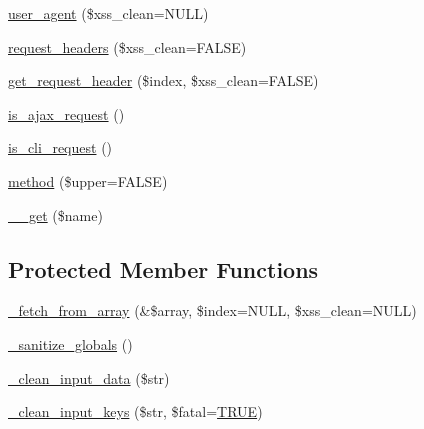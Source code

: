 \begin{DoxyCompactItemize}
\item 
\mbox{\hyperlink{class_c_i___input_a4374172b6440fd600f78ff8efc0906c9}{user\+\_\+agent}} (\$xss\+\_\+clean=N\+U\+LL)
\item 
\mbox{\hyperlink{class_c_i___input_a4bc8f8c9a9488ff359a61f1fb60e6097}{request\+\_\+headers}} (\$xss\+\_\+clean=F\+A\+L\+SE)
\item 
\mbox{\hyperlink{class_c_i___input_a099af71b54f9edbfb20576a4e8a3df41}{get\+\_\+request\+\_\+header}} (\$index, \$xss\+\_\+clean=F\+A\+L\+SE)
\item 
\mbox{\hyperlink{class_c_i___input_a4ae07120b0b2ace90eb2f7ec72b29426}{is\+\_\+ajax\+\_\+request}} ()
\item 
\mbox{\hyperlink{class_c_i___input_a70c1e8a081ef955c1a52164634d4f66e}{is\+\_\+cli\+\_\+request}} ()
\item 
\mbox{\hyperlink{class_c_i___input_aaa22626885bdf9dda2346ee6422203ef}{method}} (\$upper=F\+A\+L\+SE)
\item 
\mbox{\hyperlink{class_c_i___input_abc8e9e31bb15c8a44c3210ec551407c8}{\+\_\+\+\_\+get}} (\$name)
\end{DoxyCompactItemize}
\subsection*{Protected Member Functions}
\begin{DoxyCompactItemize}
\item 
\mbox{\hyperlink{class_c_i___input_aac46f9fee9467fac5711f236d248fbc7}{\+\_\+fetch\+\_\+from\+\_\+array}} (\&\$array, \$index=N\+U\+LL, \$xss\+\_\+clean=N\+U\+LL)
\item 
\mbox{\hyperlink{class_c_i___input_aadbb0e5cbf9b5783c872cb402ea6a2fa}{\+\_\+sanitize\+\_\+globals}} ()
\item 
\mbox{\hyperlink{class_c_i___input_a9c594152e7b189a290f6425df8712b73}{\+\_\+clean\+\_\+input\+\_\+data}} (\$str)
\item 
\mbox{\hyperlink{class_c_i___input_ac1c5fa9a21372d3dacb1fb99f9418384}{\+\_\+clean\+\_\+input\+\_\+keys}} (\$str, \$fatal=\mbox{\hyperlink{constants_8php_ae04a3efe6aa42044f803ee90c2277846}{T\+R\+UE}})
\end{DoxyCompactItemize}

